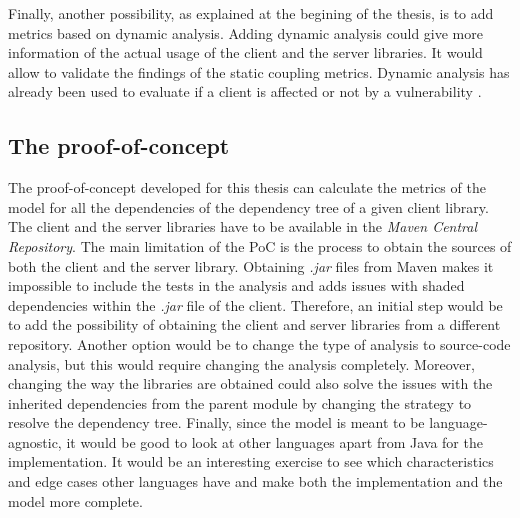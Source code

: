Finally, another possibility, as explained at the begining of the thesis, is to add metrics based on dynamic analysis. Adding dynamic analysis could give more information of the actual usage of the client and the server libraries. It would allow to validate the findings of the static coupling metrics. Dynamic analysis has already been used to evaluate if a client is affected or not by a vulnerability \cite{plate2015impact}.

\subsection{The proof-of-concept}

The proof-of-concept developed for this thesis can calculate the metrics of the model for all the dependencies of the dependency tree of a given client library. The client and the server libraries have to be available in the \textit{Maven Central Repository}. The main limitation of the PoC is the process to obtain the sources of both the client and the server library. Obtaining \textit{.jar} files from Maven makes it impossible to include the tests in the analysis and adds issues with shaded dependencies within the \textit{.jar} file of the client. Therefore, an initial step would be to add the possibility of obtaining the client and server libraries from a different repository. Another option would be to change the type of analysis to source-code analysis, but this would require changing the analysis completely. Moreover, changing the way the libraries are obtained could also solve the issues with the inherited dependencies from the parent module by changing the strategy to resolve the dependency tree. Finally, since the model is meant to be language-agnostic, it would be good to look at other languages apart from Java for the implementation. It would be an interesting exercise to see which characteristics and edge cases other languages have and make both the implementation and the model more complete.
